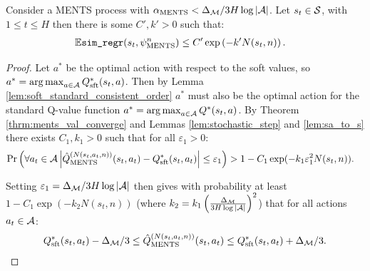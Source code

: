         \begin{lemma} \label{lem:ments_imm_simple_regret}
            Consider a MENTS process with ${\alpha_{{\textnormal{MENTS}}}}<\Delta_{\mathcal{M}}/3H\log |\mathcal{A}|$.  Let $s_t\in\mathcal{S}$, with $1\leq t \leq H$ then there is some $C',k'>0$ such that:
            \begin{align}
                \mathbb{E} {\textnormal{\texttt{sim\_regr}}}(s_{t},\psi^{n}_{{\textnormal{MENTS}}}) &\leq C'\exp\left( -k' N(s_{t},n) \right).
            \end{align}
        \end{lemma}
        \begin{proof}

            Let $a^*$ be the optimal action with respect to the soft values, so $a^*=\operatorname*{arg\,max}_{a\in\mathcal{A}} Q_{{\textnormal{sft}}}^*(s_t,a)$. Then by Lemma \ref{lem:soft_standard_consistent_order} $a^*$ must also be the optimal action for the standard Q-value function $a^*=\operatorname*{arg\,max}_{a\in\mathcal{A}} Q^*(s_t,a)$. By Theorem \ref{thrm:ments_val_converge} and Lemmas \ref{lem:stochastic_step} and \ref{lem:sa_to_s} there exists $C_1,k_1>0$ such that for all $\varepsilon_1>0$: 
            \begin{align}
                \Pr\left(\forall a_t\in\mathcal{A} \left|{\hat{Q}^{(N(s_t,a_t,n))}_{{\textnormal{MENTS}}}}(s_t,a_t)-Q_{{\textnormal{sft}}}^*(s_t,a_t)\right|\leq \varepsilon_1\right) &> 1-C_1 \exp(-k_1 \varepsilon_1^2 N(s_t,n)).
            \end{align}
            
            Setting $\varepsilon_1=\Delta_{\mathcal{M}}/3H\log |\mathcal{A}|$ then gives with probability at least $1-C_1 \exp(-k_2N(s_t,n))$ (where $k_2=k_1\left(\frac{\Delta_{\mathcal{M}}}{3H\log|\mathcal{A}|}\right)^2$) that for all actions $a_t\in\mathcal{A}$:
            \begin{align}
                Q_{{\textnormal{sft}}}^*(s_t,a_t) - \Delta_{\mathcal{M}}/3 \leq {\hat{Q}^{(N(s_t,a_t,n))}_{{\textnormal{MENTS}}}}(s_t,a_t) \leq Q_{{\textnormal{sft}}}^*(s_t,a_t) + \Delta_{\mathcal{M}}/3.
            \end{align}
            

\end{proof}

